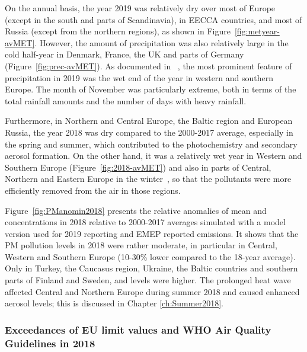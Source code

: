 On the annual basis, the year 2019 was relatively dry over most of Europe (except in the south and parts of Scandinavia), in EECCA countries, and most of Russia (except from the northern regions), as shown in Figure~\ref{fig:metyear-avMET}. However, the amount of precipitation was also relatively large in the cold half-year in Denmark, France, the UK and parts of Germany (Figure~\ref{fig:prec-avMET}). As documented in ~\citep{CAMS2020}, the most prominent feature
of precipitation in 2019 was the wet end of the year in western and southern Europe. The month of
November was particularly extreme, both in terms of the total rainfall amounts and the number of
days with heavy rainfall.


 
Furthermore, in Northern and Central Europe, the Baltic region and European Russia, the year 2018 was dry compared to the 2000-2017 average, especially in the spring and summer, which contributed to the photochemistry and secondary aerosol formation. On the other hand, it was a relatively wet year in Western and Southern Europe (Figure~\ref{fig:2018-avMET}) and also in parts of Central, Northern and Eastern Europe in the winter~\citep{CAMS2019}, so that the pollutants were more efficiently removed from the air in those regions.  


Figure~\ref{fig:PManomin2018} presents the relative anomalies of mean \PM[10] and \PM[2.5] concentrations in 2018 relative to 2000-2017 averages simulated with a model version used for 2019 reporting and EMEP reported emissions. It shows that the PM pollution levels in 2018 were rather moderate, in particular in Central, Western and Southern Europe (10-30\% lower compared to the 18-year average). Only in Turkey, the Caucasus region, Ukraine, the Baltic countries and southern parts of Finland and Sweden, \PM[10] and \PM[2.5] levels were higher. The prolonged heat wave affected Central and Northern Europe during summer 2018 and caused enhanced aerosol levels; this is discussed in Chapter \ref{ch:Summer2018}.


\subsubsection[PM exceedances]{Exceedances of EU limit values and WHO Air Quality Guidelines in 2018}
\label{subsec:PMexc}


